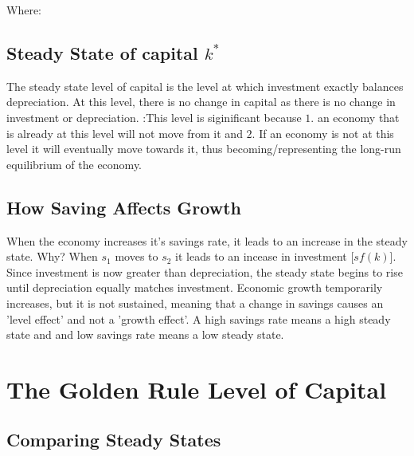 
\noindent Where:

\subsection*{Steady State of capital $k^*$} 

\noindent The steady state level of capital is the level at which investment exactly balances depreciation. At this level, there is no change in capital as there is no change in investment or depreciation. 
:This level is siginificant because $1.$ an economy that is already at this level will not move from it and $2.$ If an economy is not at this level it will eventually move towards it, thus becoming/representing the long-run equilibrium of the economy.

\subsection*{How Saving Affects Growth} 

When the economy increases it's savings rate, it leads to an increase in the steady state. Why? When $s_1$ moves to $s_2$ it leads to an incease in investment [$sf(k)$]. Since investment is now greater than depreciation, the steady state begins to rise until 
depreciation equally matches investment. Economic growth temporarily increases, but it is not sustained, meaning that a change in savings causes an 'level effect' and not a 'growth effect'. 
A high savings rate means a high steady state and and low savings rate means a low steady state.


\section{The Golden Rule Level of Capital}

\subsection{Comparing Steady States}


